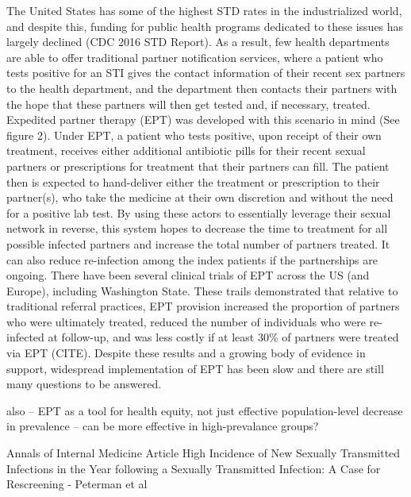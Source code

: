\documentclass [11pt, proquest] {uwthesis}[2015/03/03]
\begin{document}
The United States has some of the highest STD rates in the
industrialized world, and despite this, funding for public health
programs dedicated to these issues has largely declined (CDC 2016 STD
Report). As a result, few health departments are able to offer
traditional partner notification services, where a patient who tests
positive for an STI gives the contact information of their recent sex
partners to the health department, and the department then contacts
their partners with the hope that these partners will then get tested
and, if necessary, treated. Expedited partner therapy (EPT) was
developed with this scenario in mind (See figure 2). Under EPT, a
patient who tests positive, upon receipt of their own treatment,
receives either additional antibiotic pills for their recent sexual
partners or prescriptions for treatment that their partners can fill.
The patient then is expected to hand-deliver either the treatment or
prescription to their partner(s), who take the medicine at their own
discretion and without the need for a positive lab test. By using these
actors to essentially leverage their sexual network in reverse, this
system hopes to decrease the time to treatment for all possible infected
partners and increase the total number of partners treated. It can also
reduce re-infection among the index patients if the partnerships are
ongoing. There have been several clinical trials of EPT across the US
(and Europe), including Washington State. These trails demonstrated that
relative to traditional referral practices, EPT provision increased the
proportion of partners who were ultimately treated, reduced the number
of individuals who were re-infected at follow-up, and was less costly if
at least 30\% of partners were treated via EPT (CITE). Despite these
results and a growing body of evidence in support, widespread
implementation of EPT has been slow and there are still many questions
to be answered.

also -- EPT as a tool for health equity, not just effective
population-level decrease in prevalence -- can be more effective in
high-prevalance groups?

Annals of Internal Medicine Article High Incidence of New Sexually
Transmitted Infections in the Year following a Sexually Transmitted
Infection: A Case for Rescreening - Peterman et al
\end{document}
